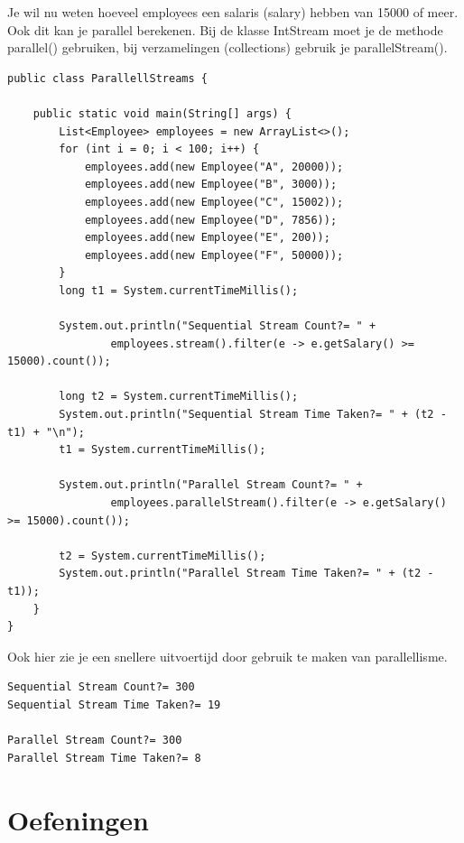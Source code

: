 \documentclass{tstextbook}
\begin{document}
Je wil nu weten hoeveel employees een salaris (salary) hebben van 15000 of meer. Ook dit kan je parallel berekenen. Bij de klasse IntStream moet je de methode parallel() gebruiken, bij verzamelingen (collections) gebruik je parallelStream().

\begin{lstlisting}
public class ParallellStreams {

	public static void main(String[] args) {
		List<Employee> employees = new ArrayList<>();
		for (int i = 0; i < 100; i++) {
			employees.add(new Employee("A", 20000));
			employees.add(new Employee("B", 3000));
			employees.add(new Employee("C", 15002));
			employees.add(new Employee("D", 7856));
			employees.add(new Employee("E", 200));
			employees.add(new Employee("F", 50000));
		}
		long t1 = System.currentTimeMillis();

		System.out.println("Sequential Stream Count?= " +
				employees.stream().filter(e -> e.getSalary() >= 15000).count());

		long t2 = System.currentTimeMillis();
		System.out.println("Sequential Stream Time Taken?= " + (t2 - t1) + "\n");
		t1 = System.currentTimeMillis();

		System.out.println("Parallel Stream Count?= " +
				employees.parallelStream().filter(e -> e.getSalary() >= 15000).count());

		t2 = System.currentTimeMillis();
		System.out.println("Parallel Stream Time Taken?= " + (t2 - t1));
	}
}
\end{lstlisting}

Ook hier zie je een snellere uitvoertijd door gebruik te maken van parallellisme.

\begin{verbatim}
Sequential Stream Count?= 300
Sequential Stream Time Taken?= 19

Parallel Stream Count?= 300
Parallel Stream Time Taken?= 8
\end{verbatim}

\section{Oefeningen}
\end{document}
